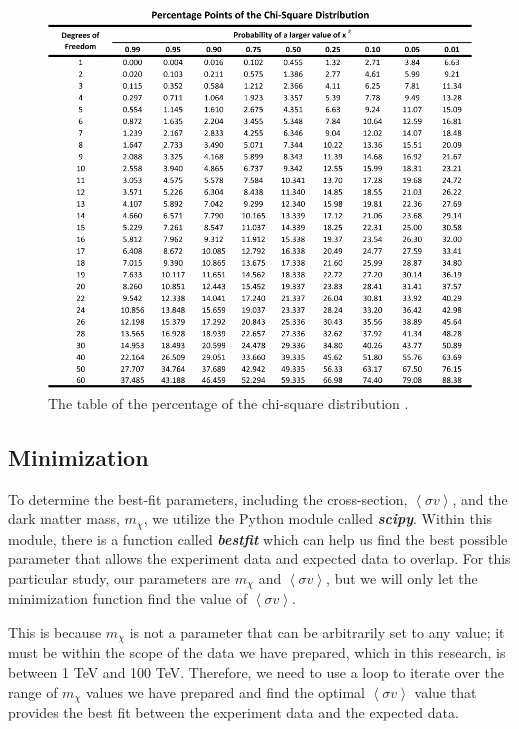 \documentclass[10pt, oneside]{book}
\numberwithin{equation}{chapter}
\begin{document}
\begin{figure}[h]
    \centering
    \includegraphics[width=\linewidth]{images/chi-square-table.png}
    \caption{The table of the percentage of the chi-square distribution \cite{passel}.}
    \label{fig:chi-square-table}
\end{figure}

\subsection{Minimization}
To determine the best-fit parameters, including the cross-section, $\left<\sigma v\right>$, and the dark matter mass, $m_\chi$, we utilize the Python module called \textbf{\textit{scipy}}. Within this module, there is a function called \textbf{\textit{bestfit}} which can help us find the best possible parameter that allows the experiment data and expected data to overlap. For this particular study, our parameters are $m_\chi$ and $\left<\sigma v\right>$, but we will only let the minimization function find the value of $\left<\sigma v\right>$.

This is because $m_\chi$ is not a parameter that can be arbitrarily set to any value; it must be within the scope of the data we have prepared, which in this research, is between 1 TeV and 100 TeV. Therefore, we need to use a loop to iterate over the range of $m_\chi$ values we have prepared and find the optimal $\left<\sigma v\right>$ value that provides the best fit between the experiment data and the expected data.
\end{document}
